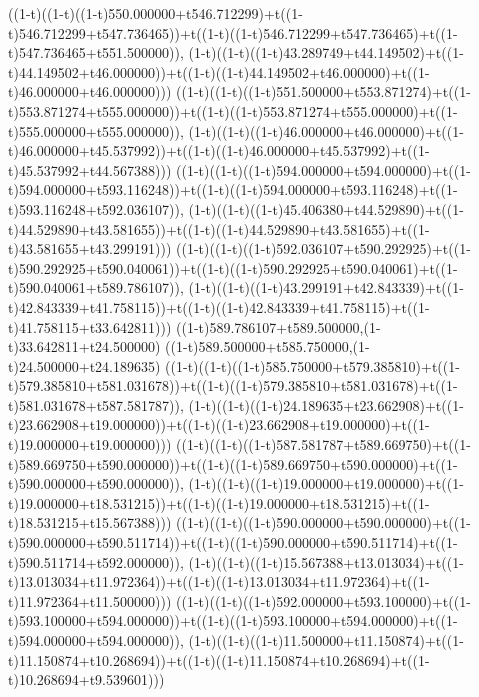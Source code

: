 ((1-t)((1-t)((1-t)550.000000+t546.712299)+t((1-t)546.712299+t547.736465))+t((1-t)((1-t)546.712299+t547.736465)+t((1-t)547.736465+t551.500000)),                                     (1-t)((1-t)((1-t)43.289749+t44.149502)+t((1-t)44.149502+t46.000000))+t((1-t)((1-t)44.149502+t46.000000)+t((1-t)46.000000+t46.000000)))
((1-t)((1-t)((1-t)551.500000+t553.871274)+t((1-t)553.871274+t555.000000))+t((1-t)((1-t)553.871274+t555.000000)+t((1-t)555.000000+t555.000000)),                                     (1-t)((1-t)((1-t)46.000000+t46.000000)+t((1-t)46.000000+t45.537992))+t((1-t)((1-t)46.000000+t45.537992)+t((1-t)45.537992+t44.567388)))
((1-t)((1-t)((1-t)594.000000+t594.000000)+t((1-t)594.000000+t593.116248))+t((1-t)((1-t)594.000000+t593.116248)+t((1-t)593.116248+t592.036107)),                                     (1-t)((1-t)((1-t)45.406380+t44.529890)+t((1-t)44.529890+t43.581655))+t((1-t)((1-t)44.529890+t43.581655)+t((1-t)43.581655+t43.299191)))
((1-t)((1-t)((1-t)592.036107+t590.292925)+t((1-t)590.292925+t590.040061))+t((1-t)((1-t)590.292925+t590.040061)+t((1-t)590.040061+t589.786107)),                                     (1-t)((1-t)((1-t)43.299191+t42.843339)+t((1-t)42.843339+t41.758115))+t((1-t)((1-t)42.843339+t41.758115)+t((1-t)41.758115+t33.642811)))
((1-t)589.786107+t589.500000,(1-t)33.642811+t24.500000)
((1-t)589.500000+t585.750000,(1-t)24.500000+t24.189635)
((1-t)((1-t)((1-t)585.750000+t579.385810)+t((1-t)579.385810+t581.031678))+t((1-t)((1-t)579.385810+t581.031678)+t((1-t)581.031678+t587.581787)),                                     (1-t)((1-t)((1-t)24.189635+t23.662908)+t((1-t)23.662908+t19.000000))+t((1-t)((1-t)23.662908+t19.000000)+t((1-t)19.000000+t19.000000)))
((1-t)((1-t)((1-t)587.581787+t589.669750)+t((1-t)589.669750+t590.000000))+t((1-t)((1-t)589.669750+t590.000000)+t((1-t)590.000000+t590.000000)),                                     (1-t)((1-t)((1-t)19.000000+t19.000000)+t((1-t)19.000000+t18.531215))+t((1-t)((1-t)19.000000+t18.531215)+t((1-t)18.531215+t15.567388)))
((1-t)((1-t)((1-t)590.000000+t590.000000)+t((1-t)590.000000+t590.511714))+t((1-t)((1-t)590.000000+t590.511714)+t((1-t)590.511714+t592.000000)),                                     (1-t)((1-t)((1-t)15.567388+t13.013034)+t((1-t)13.013034+t11.972364))+t((1-t)((1-t)13.013034+t11.972364)+t((1-t)11.972364+t11.500000)))
((1-t)((1-t)((1-t)592.000000+t593.100000)+t((1-t)593.100000+t594.000000))+t((1-t)((1-t)593.100000+t594.000000)+t((1-t)594.000000+t594.000000)),                                     (1-t)((1-t)((1-t)11.500000+t11.150874)+t((1-t)11.150874+t10.268694))+t((1-t)((1-t)11.150874+t10.268694)+t((1-t)10.268694+t9.539601)))
